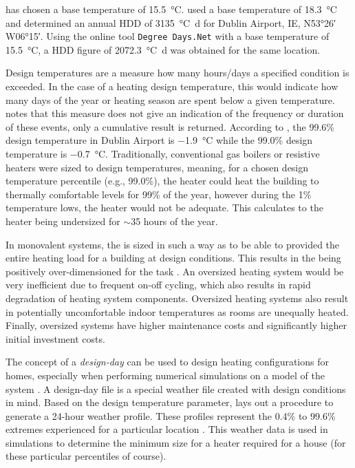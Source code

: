 has chosen a base temperature of \SI{15.5}{\celsius}.  used a base temperature of \SI{18.3}{\celsius} and determined an annual \ac{HDD} of \SI{3135}{\celsius\day} for Dublin Airport, IE, N\ang{53;26;} W\ang{06;15;}. Using the online tool \texttt{Degree Days.Net} \cite{degreedays} with a base temperature of \SI{15.5}{\celsius}, a \ac{HDD} figure of \SI{2072.3}{\celsius\day} was obtained for the same location.  

Design temperatures are a measure how many hours/days a specified condition is exceeded. In the case of a heating design temperature, this would indicate how many days of the year or heating season are spent below a given temperature.  notes that this measure does not give an indication of the frequency or duration of these events, only a cumulative result is returned. According to , the 99.6\% design temperature in Dublin Airport is \SI{-1.9}{\celsius} while the 99.0\% design temperature is \SI{-0.7}{\celsius}. Traditionally, conventional gas boilers or resistive heaters were sized to design temperatures, meaning, for a chosen design temperature percentile (e.g., 99.0\%), the heater could heat the building to thermally comfortable levels for 99\% of the year, however during the 1\% temperature lows, the heater would not be adequate. This calculates to the heater being undersized for $\sim$35 hours of the year. 

In monovalent systems, the \HP is sized in such a way as to be able to provided the entire heating load for a building at design conditions. This results in the \HP being positively over-dimensioned for the task \cite{klein_numerical_2014}. An oversized heating system would be very inefficient due to frequent on-off cycling, which also results in rapid degradation of heating system components. Oversized heating systems also result in potentially uncomfortable indoor temperatures as rooms are unequally heated. Finally, oversized systems have higher maintenance costs and significantly higher initial investment costs.

The concept of a \textit{design-day} can be used to design heating configurations for homes, especially when performing numerical simulations on a model of the system \cite{rauschkolb_cost-optimal_2020}. A design-day file is a special weather file created with design conditions in mind. Based on the design temperature parameter,  lays out a procedure to generate a 24-hour weather profile. These profiles represent the 0.4\% to 99.6\% extremes experienced for a particular location \cite{owen_ashrae_2009}. This weather data is used in simulations to determine the minimum size for a heater required for a house (for these particular percentiles of course). 

